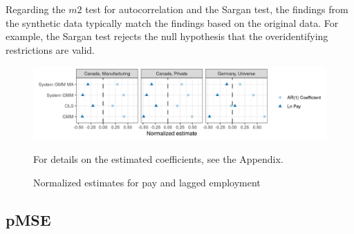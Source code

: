 Regarding the $m2$ test for autocorrelation and the Sargan test, the findings from the synthetic data typically match the findings based on the original data. For example, the Sargan test rejects the null hypothesis that the overidentifying restrictions are valid.

  



%





\begin{figure} [H]
\centering
\includegraphics[width=\linewidth]{r-graphs/fig_estimates3.png}
\caption{Normalized estimates for pay and lagged employment\label{fig:estimates3}} 
\begin{minipage}{0.48\linewidth}
{\footnotesize For details on the estimated coefficients, see the Appendix. \par}
\end{minipage}
\end{figure}

\clearpage

\subsection{pMSE}



